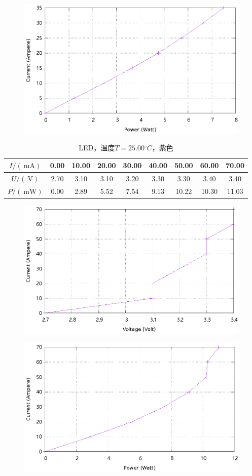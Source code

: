 \documentclass{ctexart}
\newcommand{\si}[1]{\  \mathrm{#1}}
\begin{document}
\begin{figure}[H]
    \centering
    \includegraphics[width=0.9\linewidth]{../output/led-pc-1.gnuplot}
\end{figure}
\newpage
\begin{table}[H]
    \centering
    \begin{tabular}{|c|c|c|c|c|c|c|c|c|}
        \hline
        $I/(\si{mA})$ & 0.00 & 10.00 & 20.00 & 30.00 & 40.00 & 50.00 & 60.00 & 70.00 \\\hline
        $U / (\si{V})$  & 2.70 & 3.10 & 3.10 & 3.20 & 3.30 & 3.30 & 3.40 & 3.40 \\\hline
        $P / (\si{mW})$ & 0.00 & 2.89 & 5.52 & 7.54 & 9.13 & 10.22 & 10.30 & 11.03 \\\hline
    \end{tabular}
    \caption{LED，温度$T=25.00{}^{\circ}C$，紫色}
\end{table}
\begin{figure}[H]
    \centering
    \includegraphics[width=0.9\linewidth]{../output/led-vc-2.gnuplot}
\end{figure}
\begin{figure}[H]
    \centering
    \includegraphics[width=0.9\linewidth]{../output/led-pc-2.gnuplot}
\end{figure}
\end{document}
